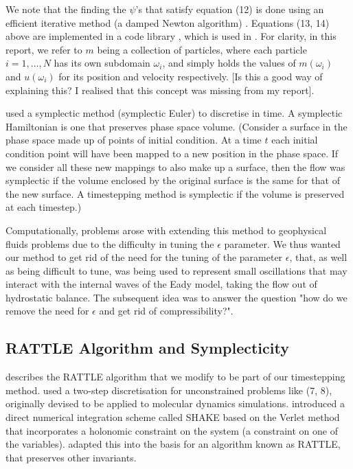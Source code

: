 \documentclass[11pt, oneside]{article}   	%
\begin{document}
We note that the finding the \(\psi\)'s that satisfy equation (12) is done using an efficient iterative method (a damped Newton algorithm) \citep{merigot2017algorithm}. Equations (13, 14) above are implemented in a code library \citep{merigotpymongeampere}, which is used in \cite{gallouet2016lagrangian}.  For clarity, in this report, we refer to \(m\) being a collection of particles, where each particle \(i=1,\dots,N\) has its own subdomain \(\omega_i\), and simply holds the values of \(m(\omega_i)\) and \(u(\omega_i)\) for its position and velocity respectively.
[Is this a good way of explaining this? I realised that this concept was missing from my report].

\cite{gallouet2016lagrangian} used a symplectic method (symplectic Euler) to discretise in time. A symplectic Hamiltonian is one that preserves phase space volume. (Consider a surface in the phase space made up of points of initial condition. At a time \(t\) each initial condition point will have been mapped to a new position in the phase space. If we consider all these new mappings to also make up a surface, then the flow was symplectic if the volume enclosed by the original surface is the same for that of the new surface. A timestepping method is symplectic if the volume is preserved at each timestep.)

Computationally, problems arose with extending this method to geophysical fluids problems due to the difficulty in tuning the \(\epsilon\) parameter. We thus wanted our method to get rid of the need for the tuning of the parameter \(\epsilon\), that, as well as being difficult to tune, was being used to represent small oscillations that may interact with the internal waves of the Eady model, taking the flow out of hydrostatic balance. The subsequent idea was to answer the question "how do we remove the need for \(\epsilon\) and get rid of compressibility?".

\subsection{RATTLE Algorithm and Symplecticity}

\cite{leimkuhler1994symplectic} describes the RATTLE algorithm that we modify to be part of our timestepping method. \cite{verlet1967computer} used a two-step discretisation for unconstrained problems like (7, 8), originally devised to be applied to molecular dynamics simulations. \cite{ryckaert1977numerical} introduced a direct numerical integration scheme called SHAKE based on the Verlet method that incorporates a holonomic constraint on the system (a constraint on one of the variables). \cite{andersen1983rattle} adapted this into the basis for an algorithm known as RATTLE, that preserves other invariants.
\end{document}
